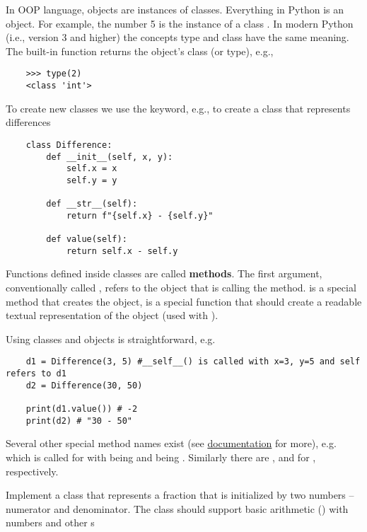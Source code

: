 In OOP language, objects are instances of classes. Everything in Python is an object. For example, the number 5 is the instance of a class . In modern Python (i.e., version 3 and higher) the concepts type and class have the same meaning. The built-in function  returns the object's class (or type), e.g.,
\begin{lstlisting}
    >>> type(2)
    <class 'int'>
\end{lstlisting}

To create new classes we use the  keyword, e.g., to create a class that represents differences
\begin{lstlisting}
    class Difference:
        def __init__(self, x, y):
            self.x = x
            self.y = y
            
        def __str__(self):
            return f"{self.x} - {self.y}"
        
        def value(self):
            return self.x - self.y
\end{lstlisting}
Functions defined inside classes are called \textbf{methods}. The first argument, conventionally called , refers to the object that is calling the method.  is a special method that creates the object,  is a special function that should create a readable textual representation of the object (used with ).

    Using classes and objects is straightforward, e.g.
\begin{lstlisting}
    d1 = Difference(3, 5) #__self__() is called with x=3, y=5 and self refers to d1
    d2 = Difference(30, 50) 

    print(d1.value()) # -2
    print(d2) # "30 - 50"
\end{lstlisting}

Several other special method names exist (see \href{https://docs.python.org/3/reference/datamodel.html#emulating-numeric-types}{documentation} for more), e.g.  which is called for  with  being  and  being . Similarly there are ,  and  for \ls{-, *, /}, respectively.

\begin{exercise}
    Implement a  class that represents a fraction that is initialized by two numbers -- numerator and denominator. The class should support basic arithmetic (\ls{+,-,*,/}) with numbers and other s
\end{exercise}

